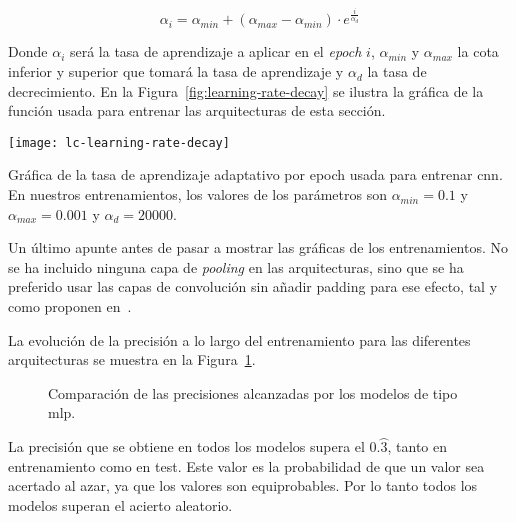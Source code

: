 \begin{equation}
    \alpha_i = \alpha_{min} + (\alpha_{max} - \alpha_{min}) \cdot e^\frac{i}{\alpha_d}
	\label{eq:learning-rate-decay}
\end{equation}

Donde $\alpha_i$ será la tasa de aprendizaje a aplicar en el \textit{epoch} $i$, $\alpha_{min}$ y $\alpha_{max}$ la cota inferior y superior que tomará la tasa de aprendizaje y $\alpha_d$ la tasa de decrecimiento. En la Figura~\ref{fig:learning-rate-decay} se ilustra la gráfica de la función usada para entrenar las arquitecturas de esta sección.

\begin{marginfigure}
	\centering
	\texttt{[image: lc-learning-rate-decay]}
	\caption[Gráfica de la tasa de aprendizaje adaptativo por epoch usada para entrenar \ac{cnn}]{Gráfica de la tasa de aprendizaje adaptativo por epoch usada para entrenar \ac{cnn}. En nuestros entrenamientos, los valores de los parámetros son $\alpha_{min} = 0.1$ y $\alpha_{max} = 0.001$ y $\alpha_d = 20000$.}
	\label{fig:learning-rate-decay}
\end{marginfigure}

Un último apunte antes de pasar a mostrar las gráficas de los entrenamientos. No se ha incluido ninguna capa de \textit{pooling} en las arquitecturas, sino que se ha preferido usar las capas de convolución sin añadir padding para ese efecto, tal y como proponen en~\cite{howard2017mobilenets}.

La evolución de la precisión a lo largo del entrenamiento para las diferentes arquitecturas se muestra en la Figura~\ref{fig:lc-cnn-training-validation-test-comparison}.

\begin{figure}
	\centering
	\qquad
	\caption[Comparación de las precisiones alcanzadas por los modelos de tipo \ac{mlp}]{Comparación de las precisiones alcanzadas por los modelos de tipo \ac{mlp}.}
	\label{fig:lc-cnn-training-validation-test-comparison}
\end{figure}

La precisión que se obtiene en todos los modelos supera el $0.\wideparen{3}$, tanto en entrenamiento como en test. Este valor es la probabilidad de que un valor sea acertado al azar, ya que los valores son equiprobables. Por lo tanto todos los modelos superan el acierto aleatorio.


